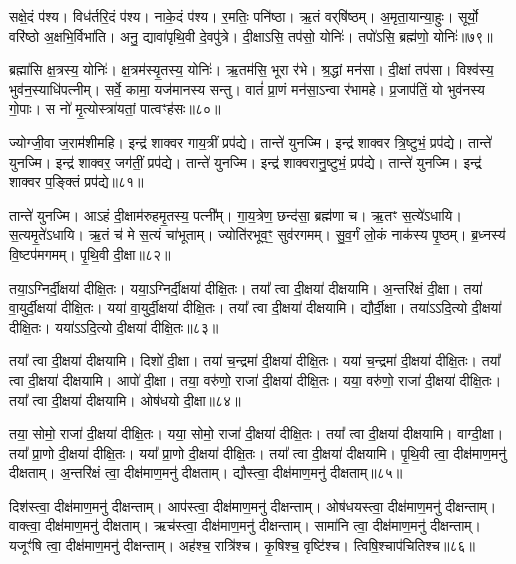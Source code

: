 सक्षे॒दं प॑श्य।
विध॑र्तरि॒दं प॑श्य।
नाके॒दं प॑श्य।
र॒मतिः॒ पनि॑ष्ठा।
ऋ॒तं वर्‌\mbox{}षि॑ष्ठम्।
अ॒मृता॒यान्या॒हुः।
सूर्यो॒ वरि॑ष्ठो अ॒क्षभि॒र्विभा॑ति।
अनु॒ द्यावा॑पृथि॒वी दे॒वपु॑त्रे।
दी॒क्षाऽसि॒ तप॑सो॒ योनिः॑।
तपो॑ऽसि॒ ब्रह्म॑णो॒ योनिः॑॥७९॥\ip

ब्रह्मा॑सि क्ष॒त्रस्य॒ योनिः॑।
क्ष॒त्रम॑स्यृ॒तस्य॒ योनिः॑।
ऋ॒तम॑सि॒ भूरा र॑भे।
श्र॒द्धां मन॑सा।
दी॒क्षां तप॑सा।
विश्व॑स्य॒ भुव॑न॒स्याधि॑पत्नीम्।
सर्वे॒ कामा॒ यज॑मानस्य सन्तु।
वातं॑ प्रा॒णं मन॑सा॒\-ऽन्वा र॑भामहे।
प्र॒जा\-प॑तिं॒ यो भुव॑नस्य गो॒पाः।
स नो॑ मृ॒त्योस्त्रा॑यतां॒ पात्वꣳह॑सः॥८०॥\ip

ज्योग्जी॒वा ज॒राम॑शीमहि।
इन्द्र॑ शाक्वर गाय॒त्रीं प्रप॑द्ये।
तान्ते॑ युनज्मि।
इन्द्र॑ शाक्वर त्रि॒ष्टुभं॒ प्रप॑द्ये।
तान्ते॑ युनज्मि।
इन्द्र॑ शाक्वर॒ जग॑तीं॒ प्रप॑द्ये।
तान्ते॑ युनज्मि।
इन्द्र॑ शाक्वरानु॒ष्टुभं॒ प्रप॑द्ये।
तान्ते॑ युनज्मि।
इन्द्र॑ शाक्वर प॒ङ्क्तिं प्रप॑द्ये॥८१॥\ip

तान्ते॑ युनज्मि।
आऽहं दी॒क्षाम॑रुहमृ॒तस्य॒ पत्नी᳚म्।
गा॒य॒त्रेण॒ छन्द॑सा॒ ब्रह्म॑णा च।
ऋ॒तꣳ स॒त्ये॑\-ऽधायि।
स॒त्यमृ॒ते॑\-ऽधायि।
ऋ॒तं च॑ मे स॒त्यं चा॑भूताम्।
ज्योति॑रभूव॒ꣳ॒ सुव॑रगमम्।
सु॒व॒र्गं लो॒कं नाक॑स्य पृ॒ष्ठम्।
ब्र॒ध्नस्य॑ वि॒ष्टप॑मगमम्।
पृ॒थि॒वी दी॒क्षा॥८२॥\ip

तया॒ऽग्निर्दी॒क्षया॑ दीक्षि॒तः।
यया॒ऽग्निर्दी॒क्षया॑ दीक्षि॒तः।
तया᳚ त्वा दी॒क्षया॑ दीक्षयामि।
अ॒न्तरि॑क्षं दी॒क्षा।
तया॑ वा॒युर्दी॒क्षया॑ दीक्षि॒तः।
यया॑ वा॒युर्दी॒क्षया॑ दीक्षि॒तः।
तया᳚ त्वा दी॒क्षया॑ दीक्षयामि।
द्यौर्दी॒क्षा।
तया॑ऽऽदि॒त्यो दी॒क्षया॑ दीक्षि॒तः।
यया॑ऽऽदि॒त्यो दी॒क्षया॑ दीक्षि॒तः॥८३॥\ip

तया᳚ त्वा दी॒क्षया॑ दीक्षयामि।
दिशो॑ दी॒क्षा।
तया॑ च॒न्द्रमा॑ दी॒क्षया॑ दीक्षि॒तः।
यया॑ च॒न्द्रमा॑ दी॒क्षया॑ दीक्षि॒तः।
तया᳚ त्वा दी॒क्षया॑ दीक्षयामि।
आपो॑ दी॒क्षा।
तया॒ वरु॑णो॒ राजा॑ दी॒क्षया॑ दीक्षि॒तः।
यया॒ वरु॑णो॒ राजा॑ दी॒क्षया॑ दीक्षि॒तः।
तया᳚ त्वा दी॒क्षया॑ दीक्षयामि।
ओष॑धयो दी॒क्षा॥८४॥\ip

तया॒ सोमो॒ राजा॑ दी॒क्षया॑ दीक्षि॒तः।
यया॒ सोमो॒ राजा॑ दी॒क्षया॑ दीक्षि॒तः।
तया᳚ त्वा दी॒क्षया॑ दीक्षयामि।
वाग्दी॒क्षा।
तया᳚ प्रा॒णो दी॒क्षया॑ दीक्षि॒तः।
यया᳚ प्रा॒णो दी॒क्षया॑ दीक्षि॒तः।
तया᳚ त्वा दी॒क्षया॑ दीक्षयामि।
पृ॒थि॒वी त्वा॒ दीक्ष॑\-माण॒\-मनु॑ दीक्षताम्।
अ॒न्तरि॑क्षं त्वा॒ दीक्ष॑\-माण॒\-मनु॑ दीक्षताम्।
द्यौस्त्वा॒ दीक्ष॑\-माण॒\-मनु॑ दीक्षताम्॥८५॥\ip

दिश॑स्त्वा॒ दीक्ष॑\-माण॒\-मनु॑ दीक्षन्ताम्।
आप॑स्त्वा॒ दीक्ष॑\-माण॒\-मनु॑ दीक्षन्ताम्।
ओष॑धयस्त्वा॒ दीक्ष॑\-माण॒\-मनु॑ दीक्षन्ताम्।
वाक्त्वा॒ दीक्ष॑\-माण॒\-मनु॑ दीक्षताम्।
ऋच॑स्त्वा॒ दीक्ष॑\-माण॒\-मनु॑ दीक्षन्ताम्।
सामा॑नि त्वा॒ दीक्ष॑\-माण॒\-मनु॑ दीक्षन्ताम्।
यजूꣳ॑षि त्वा॒ दीक्ष॑\-माण॒\-मनु॑ दीक्षन्ताम्।
अह॑श्च॒ रात्रि॑श्च।
कृ॒षिश्च॒ वृष्टि॑श्च।
त्विषि॒श्चाप॑चितिश्च॥८६॥\ip

